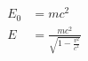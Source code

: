 \documentclass{article}
\begin{document}
    \begin{align}
    E_0 &= mc^2 \\
    E &= \frac{mc^2}{\sqrt{1-\frac{v^2}{c^2}}}
    \end{align}
\end{document}
